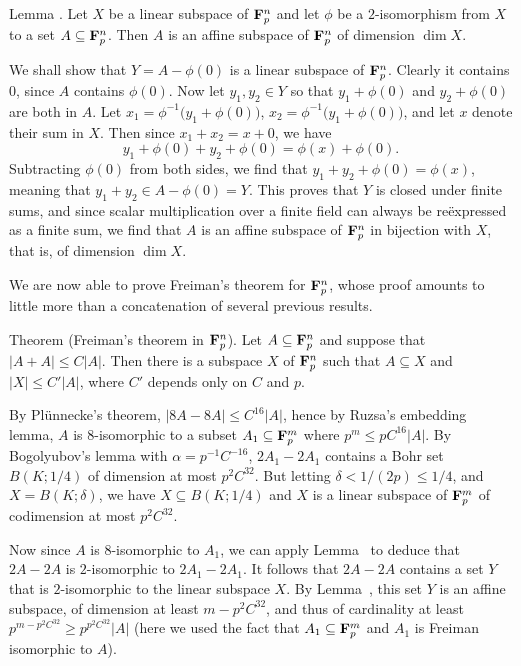 \edef\lemaffinefreiman{\the\thmcount}
\proclaim Lemma {\advthm}. Let $X$ be a linear subspace of ${\bf F}_p^n$ and let $\phi$ be a $2$-isomorphism
from $X$ to a set $A\subseteq {\bf F}_p^n$. Then $A$ is an affine subspace of ${\bf F}_p^n$ of dimension $\dim X$.

\proof We shall show that $Y = A - \phi(0)$ is a linear subspace of ${\bf F}_p^n$. Clearly it contains $0$,
since $A$ contains $\phi(0)$. Now let $y_1,y_2\in Y$ so that $y_1 + \phi(0)$ and $y_2+\phi(0)$ are both in $A$.
Let $x_1 = \phi^{-1}\bigl(y_1+\phi(0)\bigr)$, $x_2 = \phi^{-1}\bigl(y_1+\phi(0)\bigr)$, and let $x$ denote
their sum in $X$. Then since $x_1 + x_2 = x+0$, we have
$$y_1 + \phi(0) + y_2 + \phi(0) = \phi(x) + \phi(0).$$
Subtracting $\phi(0)$ from both sides, we find that $y_1 + y_2 + \phi(0) = \phi(x)$, meaning
that $y_1 + y_2 \in A - \phi(0) = Y$. This proves that $Y$ is closed under finite sums, and since scalar
multiplication over a finite field can always be re\"expressed as a finite sum, we find that
$A$ is an affine subspace of ${\bf F}_p^n$ in bijection with $X$, that is, of dimension $\dim X$.\slug

We are now able to prove Freiman's theorem for ${\bf F}_p^n$, whose proof amounts to little more than
a concatenation of several previous results.

\parenproclaim Theorem {\advthm} (Freiman's theorem in ${\bf F}_p^n$). Let $A\subseteq {\bf F}_p^n$ and suppose
that $|A+A|\le C|A|$. Then there is a subspace $X$ of ${\bf F}_p^n$ such that $A\subseteq X$ and $|X|\le C'|A|$,
where $C'$ depends only on $C$ and $p$.

\proof By Pl\"unnecke's theorem, $|8A-8A| \le C^{16} |A|$, hence by Ruzsa's embedding lemma, $A$
is $8$-isomorphic to a subset $A_1\subseteq {\bf F}_p^m$ where $p^m \le pC^{16}|A|$. By Bogolyubov's lemma
with $\alpha = p^{-1}C^{-16}$, $2A_1 - 2A_1$ contains a Bohr set $B(K;1/4)$ of dimension at most
$p^2C^{32}$. But letting $\delta < 1/(2p) \le 1/4$, and $X = B(K;\delta)$, we have $X\subseteq B(K;1/4)$
and $X$ is a linear subspace of ${\bf F}_p^m$ of codimension at most $p^2C^{32}$.

Now since $A$ is $8$-isomorphic to $A_1$, we can apply Lemma~{\leminducedfreiman} to deduce that
$2A-2A$ is $2$-isomorphic to $2A_1 - 2A_1$. It follows that
$2A-2A$ contains a set $Y$ that is $2$-isomorphic to the linear subspace $X$. By Lemma~{\lemaffinefreiman},
this set $Y$ is an affine subspace, of dimension at least $m-p^2C^{32}$, and thus of cardinality
at least $p^{m-p^2C^{32}} \ge p^{p^2C^{32}}|A|$ (here we used the fact that $A_1\subseteq {\bf F}_p^m$ and
$A_1$ is Freiman isomorphic to $A$).

